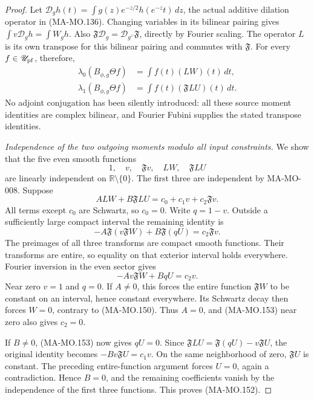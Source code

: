 \begin{proof}
Let \(\mathcal D_g h(t)=\int g(z)e^{-z/2}h(e^{-z}t)\,dz\),
the actual additive dilation operator in (MA-MO.136).
Changing variables in its bilinear pairing gives
\(\int v\mathcal D_g h=\int W_g h\).
Also \(\mathfrak F\mathcal D_g
=\mathcal D_{g^\vee}\mathfrak F\), directly by Fourier
scaling. The operator \(L\) is its own transpose for
this bilinear pairing and commutes with \(\mathfrak F\).
For every \(f\in\mathscr U_{\rm pf}\), therefore,
\[
 \begin{aligned}
 \lambda_0(B_{\phi,g}\Theta f)&=\int f(t)(LW)(t)\,dt,\\
 \lambda_1(B_{\phi,g}\Theta f)&=\int f(t)(\mathfrak F LU)(t)\,dt.
 \end{aligned}
 \tag{MA-MO.151}
\]
No adjoint conjugation has been silently introduced: all
these source moment identities are complex bilinear, and
Fourier Fubini supplies the stated transpose identities.

\emph{Independence of the two outgoing moments modulo all input constraints.}
We show that the five even smooth functions
\[
                 1,\quad v,\quad\mathfrak Fv,
                       \quad LW,\quad\mathfrak F LU
 \tag{MA-MO.152}
\]
are linearly independent on \(\mathbb R\setminus\{0\}\).
The first three are independent by MA-MO-008. Suppose
\[
        A LW+B\mathfrak F LU=c_0+c_1v+c_2\mathfrak Fv.
\]
All terms except \(c_0\) are Schwartz, so \(c_0=0\).
Write \(q=1-v\). Outside a sufficiently large compact
interval the remaining identity is
\[
           -A\mathfrak F(v\mathfrak FW)+B\mathfrak F(qU)
                       =c_2\mathfrak Fv.
\]
The preimages of all three transforms are compact smooth
functions. Their transforms are entire, so equality on
that exterior interval holds everywhere. Fourier inversion
in the even sector gives
\[
                  -A v\mathfrak FW+BqU=c_2v.
 \tag{MA-MO.153}
\]
Near zero \(v=1\) and \(q=0\). If \(A\ne0\), this
forces the entire function \(\mathfrak FW\) to be
constant on an interval, hence constant everywhere.
Its Schwartz decay then forces \(W=0\), contrary to
(MA-MO.150). Thus \(A=0\), and (MA-MO.153) near zero
also gives \(c_2=0\).

If \(B\ne0\), (MA-MO.153) now gives \(qU=0\).
Since
\(\mathfrak F LU=\mathfrak F(qU)-v\mathfrak FU\),
the original identity becomes
\(-Bv\mathfrak FU=c_1v\). On the same neighborhood
of zero, \(\mathfrak FU\) is constant. The preceding
entire-function argument forces \(U=0\), again a
contradiction. Hence \(B=0\), and the remaining coefficients
vanish by the independence of the first three functions.
This proves (MA-MO.152).


\end{proof}
